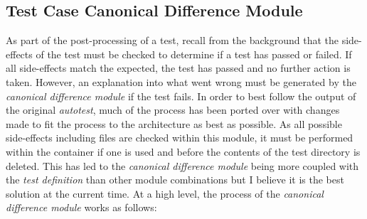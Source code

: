 \documentclass[hidelinks]{report}
\begin{document}
\subsection{Test Case Canonical Difference Module}
As part of the post-processing of a test, recall from the background that the side-effects of the test must be checked to determine if a test has passed or failed. If all side-effects match the expected, the test has passed and no further action is taken. However, an explanation into what went wrong must be generated by the \textit{canonical difference module} if the test fails. In order to best follow the output of the original \textit{autotest}, much of the process has been ported over with changes made to fit the process to the architecture as best as possible. As all possible side-effects including files are checked within this module, it must be performed within the container if one is used and before the contents of the test directory is deleted. This has led to the \textit{canonical difference module} being more coupled with the \textit{test definition} than other module combinations but I believe it is the best solution at the current time. At a high level, the process of the \textit{canonical difference module} works as follows:
\end{document}
